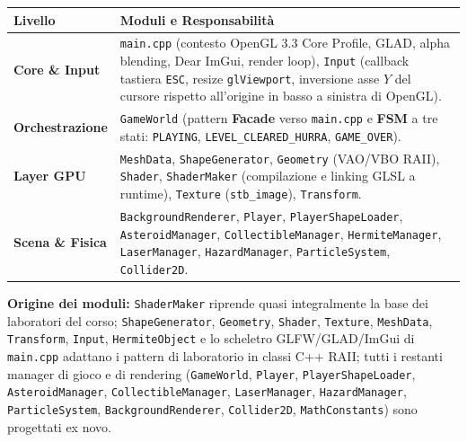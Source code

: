 \documentclass[11pt,a4paper]{article}
\begin{document}
\begin{center}
\small
\begin{tabularx}{\linewidth}{@{}p{3.3cm} X@{}}
\toprule
\textbf{Livello} & \textbf{Moduli e Responsabilità} \\
\midrule
\textbf{Core \& Input} & \texttt{main.cpp} (contesto OpenGL 3.3 Core Profile, GLAD, alpha blending, Dear ImGui, render loop), \texttt{Input} (callback tastiera \texttt{ESC}, resize \texttt{glViewport}, inversione asse $Y$ del cursore rispetto all'origine in basso a sinistra di OpenGL). \\
\textbf{Orchestrazione} & \texttt{GameWorld} (pattern \textbf{Facade} verso \texttt{main.cpp} e \textbf{FSM} a tre stati: \texttt{PLAYING}, \texttt{LEVEL\_CLEARED\_HURRA}, \texttt{GAME\_OVER}). \\
\textbf{Layer GPU} & \texttt{MeshData}, \texttt{ShapeGenerator}, \texttt{Geometry} (VAO/VBO RAII), \texttt{Shader}, \texttt{ShaderMaker} (compilazione e linking GLSL a runtime), \texttt{Texture} (\texttt{stb\_image}), \texttt{Transform}. \\
\textbf{Scena \& Fisica} & \texttt{BackgroundRenderer}, \texttt{Player}, \texttt{PlayerShapeLoader}, \texttt{AsteroidManager}, \texttt{CollectibleManager}, \texttt{HermiteManager}, \texttt{LaserManager}, \texttt{HazardManager}, \texttt{ParticleSystem}, \texttt{Collider2D}. \\
\bottomrule
\end{tabularx}
\end{center}

\begin{sloppypar}
\noindent\textbf{Origine dei moduli:} \texttt{ShaderMaker} riprende quasi integralmente la base dei laboratori del corso; \texttt{ShapeGenerator}, \texttt{Geometry}, \texttt{Shader}, \texttt{Texture}, \texttt{MeshData}, \texttt{Transform}, \texttt{Input}, \texttt{HermiteObject} e lo scheletro GLFW/GLAD/ImGui di \texttt{main.cpp} adattano i pattern di laboratorio in classi C++ RAII; tutti i restanti manager di gioco e di rendering (\texttt{GameWorld}, \texttt{Player}, \texttt{PlayerShapeLoader}, \texttt{AsteroidManager}, \texttt{CollectibleManager}, \texttt{LaserManager}, \texttt{HazardManager}, \texttt{ParticleSystem}, \texttt{BackgroundRenderer}, \texttt{Collider2D}, \texttt{MathConstants}) sono progettati ex novo.
\end{sloppypar}
\end{document}
